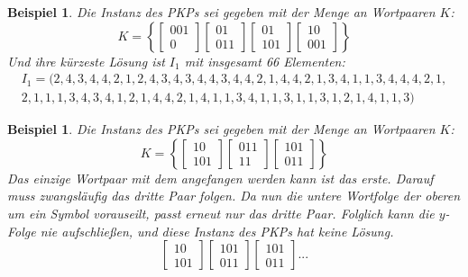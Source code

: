 \documentclass[]{scrartcl}
\newtheorem{bsp}[definition]{Beispiel}
\begin{document}
		\begin{bsp}
			\label{bsp-pkp2}
			Die Instanz des PKPs sei gegeben mit der Menge an Wortpaaren $K$:
			\[K = \left\lbrace \begin{bmatrix}
						001 \\ 0
					\end{bmatrix}
					\begin{bmatrix}
						01 \\ 011
					\end{bmatrix}
					\begin{bmatrix}
						01 \\ 101
					\end{bmatrix}
					\begin{bmatrix}
						10 \\ 001
					\end{bmatrix}\right\rbrace \]
			Und ihre kürzeste Lösung ist $I_1$ mit insgesamt 66 Elementen:
			\begin{align*}
				I_1 = (2, 4, 3, 4, 4, 2, 1, 2, 4, 3, 4, 3, 4, 4, 3, 4, 4, 2, 1, 4, 4, 2, 1, 3, 4, 1, 1, 3, 4, 4, 4, 2, 1,\\ 2, 1, 1, 1, 3, 4, 3, 4, 1, 2, 1, 4, 4, 2, 1, 4, 1, 1, 3, 4, 1, 1, 3,
					1, 1, 3, 1, 2, 1, 4, 1, 1, 3 )
			\end{align*}
		\end{bsp}
		\begin{bsp}
			\label{bsp-pkp3}
			Die Instanz des PKPs sei gegeben mit der Menge an Wortpaaren $K$:
			\[K = \left\lbrace \begin{bmatrix}
						10 \\ 101
					\end{bmatrix}
					\begin{bmatrix}
						011 \\ 11
					\end{bmatrix}
					\begin{bmatrix}
						101 \\ 011
					\end{bmatrix}\right\rbrace \]
			Das einzige Wortpaar mit dem angefangen werden kann ist das erste. Darauf muss zwangsläufig das dritte Paar folgen.  Da nun die untere Wortfolge der oberen um ein Symbol vorauseilt, passt erneut nur das dritte Paar. Folglich kann die $y$-Folge nie aufschließen, und diese Instanz des PKPs hat keine Lösung.
			\[
			\begin{bmatrix}
						10 \\ 101
					\end{bmatrix} 
					\begin{bmatrix}
						101 \\ 011
					\end{bmatrix}
					\begin{bmatrix}
						101 \\ 011
					\end{bmatrix} ...
			\]
		\end{bsp}
\end{document}
